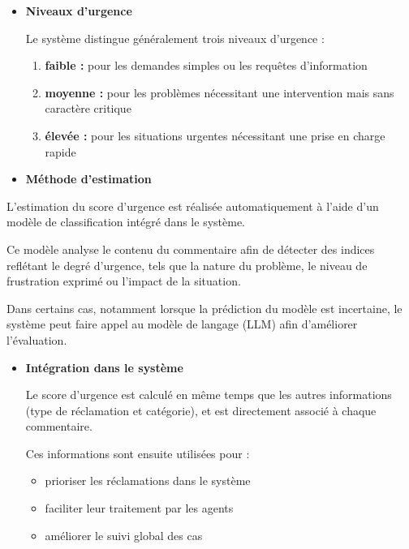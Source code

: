 \documentclass[12pt,a4paper,oneside]{report}
\begin{document}
\begin{itemize}
    \item \textbf{Niveaux d’urgence}

Le système distingue généralement trois niveaux d’urgence :

\begin{enumerate}
    \item \textbf{faible :} pour les demandes simples ou les requêtes d’information
    \item \textbf{moyenne :} pour les problèmes nécessitant une intervention mais sans caractère critique
    \item \textbf{élevée :} pour les situations urgentes nécessitant une prise en charge rapide
\end{enumerate}
\end{itemize}

\begin{itemize}
    \item \textbf{Méthode d’estimation}
\end{itemize}

L’estimation du score d’urgence est réalisée automatiquement à l’aide d’un modèle de classification intégré dans le système.

Ce modèle analyse le contenu du commentaire afin de détecter des indices reflétant le degré d’urgence, tels que la nature du problème, le niveau de frustration exprimé ou l’impact de la situation.

Dans certains cas, notamment lorsque la prédiction du modèle est incertaine, le système peut faire appel au modèle de langage (LLM) afin d’améliorer l’évaluation.

\begin{itemize}
    \item \textbf{Intégration dans le système}

Le score d’urgence est calculé en même temps que les autres informations (type de réclamation et catégorie), et est directement associé à chaque commentaire.

Ces informations sont ensuite utilisées pour :

\begin{itemize}
    \item prioriser les réclamations dans le système
    \item faciliter leur traitement par les agents
    \item améliorer le suivi global des cas
\end{itemize}
\end{itemize}
\end{document}
